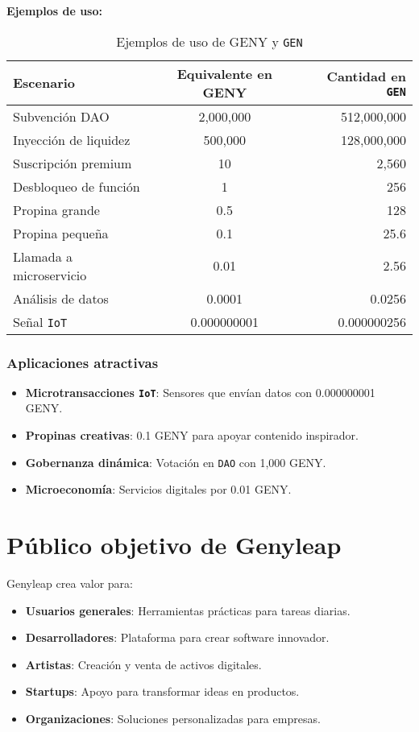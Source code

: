 \documentclass[a4paper,12pt,openany]{book}
\begin{document}
\textbf{Ejemplos de uso:}
\begin{table}[h]
\centering
\caption{Ejemplos de uso de GENY y \texttt{GEN}}
\small
\begin{tabular}{l c r}
\hline
\textbf{Escenario} & \textbf{Equivalente en GENY} & \textbf{Cantidad en \texttt{GEN}} \\
\hline
Subvención DAO & 2,000,000 & 512,000,000 \\
Inyección de liquidez & 500,000 & 128,000,000 \\
Suscripción premium & 10 & 2,560 \\
Desbloqueo de función & 1 & 256 \\
Propina grande & 0.5 & 128 \\
Propina pequeña & 0.1 & 25.6 \\
Llamada a microservicio & 0.01 & 2.56 \\
Análisis de datos & 0.0001 & 0.0256 \\
Señal \texttt{IoT} & 0.000000001 & 0.000000256 \\
\hline
\end{tabular}
\end{table}

\subsection*{Aplicaciones atractivas}
\begin{itemize}
    \item \textbf{Microtransacciones \texttt{IoT}}: Sensores que envían datos con 0.000000001 GENY.
    \item \textbf{Propinas creativas}: 0.1 GENY para apoyar contenido inspirador.
    \item \textbf{Gobernanza dinámica}: Votación en \texttt{DAO} con 1,000 GENY.
    \item \textbf{Microeconomía}: Servicios digitales por 0.01 GENY.
\end{itemize}

\chapter{Público objetivo de Genyleap}
Genyleap crea valor para:
\begin{itemize}
    \item \textbf{Usuarios generales}: Herramientas prácticas para tareas diarias.
    \item \textbf{Desarrolladores}: Plataforma para crear software innovador.
    \item \textbf{Artistas}: Creación y venta de activos digitales.
    \item \textbf{Startups}: Apoyo para transformar ideas en productos.
    \item \textbf{Organizaciones}: Soluciones personalizadas para empresas.
\end{itemize}
\end{document}
